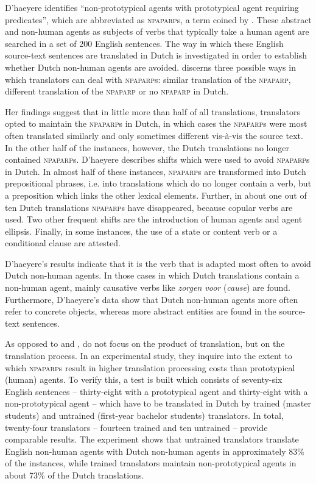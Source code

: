 \documentclass[output=paper]{LSP/langsci}
\begin{document}
D’haeyere identifies “non-prototypical agents with prototypical agent requiring predicates”, which are abbreviated as \textsc{npaparp}s, a term coined by \citet{Vandepitte2010}. These abstract and non-human agents as subjects of verbs that typically take a human agent are searched in a set of 200 English sentences. The way in which these English source-text sentences are translated in Dutch is investigated in order to establish whether Dutch non-human agents are avoided. \citet{Dhaeyere2010} discerns three possible ways in which translators can deal with \textsc{npaparp}s: similar translation of the \textsc{npaparp}, different translation of the \textsc{npaparp} or no \textsc{npaparp} in Dutch.  

Her findings suggest that in little more than half of all translations, translators opted to maintain the \textsc{npaparp}s in Dutch, in which cases the \textsc{npaparp}s were most often translated similarly and only sometimes different vis-à-vis the source text. In the other half of the instances, however, the Dutch translations no longer contained \textsc{npaparp}s. D’haeyere describes shifts which were used to avoid \textsc{npaparp}s in Dutch. In almost half of these instances, \textsc{npaparp}s are transformed into Dutch prepositional phrases, i.e. into translations which do no longer contain a verb, but a preposition which links the other lexical elements. Further, in about one out of ten Dutch translations \textsc{npaparp}s have disappeared, because copular verbs are used. Two other frequent shifts are the introduction of human agents and agent ellipsis. Finally, in some instances, the use of a state or content verb or a conditional clause are attested. 

D’haeyere’s results indicate that it is the verb that is adapted most often to avoid Dutch non-human agents. In those cases in which Dutch translations contain a non-human agent, mainly causative verbs like \textit{zorgen voor} (\textit{cause}) are found. Furthermore, D’haeyere’s data show that Dutch non-human agents more often refer to concrete objects, whereas more abstract entities are found in the source-text sentences.       

As opposed to \citet{Vandepitte2007} and \citet{Dhaeyere2010}, \citet{Vandepitte2011} do not focus on the product of translation, but on the translation process. In an experimental study, they inquire into the extent to which \textsc{npaparp}s result in higher translation processing costs than prototypical (human) agents. To verify this, a test is built which consists of seventy-six English sentences -- thirty-eight with a prototypical agent and thirty-eight with a non-prototypical agent -- which have to be translated in Dutch by trained (master students) and untrained (first-year bachelor students) translators. In total, twenty-four translators -- fourteen trained and ten untrained -- provide comparable results. The experiment shows that untrained translators translate English non-human agents with Dutch non-human agents in approximately 83\% of the instances, while trained translators maintain non-prototypical agents in about 73\% of the Dutch translations. 
\end{document}

